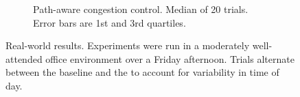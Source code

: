 \begin{figure}[t]
\begin{subfigure}{0.48\linewidth}
	\vspace{-0.5cm}
	\caption{\footnotesize Path-aware congestion control.
	Median of 20 trials. Error bars are 1st and 3rd quartiles.}
	\label{fig:real-world:scenario2}
\end{subfigure}
\vspace{-0.2cm}
\caption{Real-world results. Experiments were run in a moderately well-attended
office environment over a Friday afternoon. Trials alternate between the
baseline and the \sys to account for variability in time of day.
\vspace{-0.6cm}
}
\label{fig:real-world}
\end{figure}

